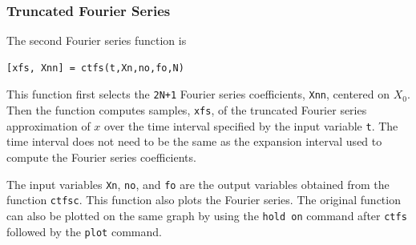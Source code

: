 \subsubsection{Truncated Fourier Series}
The second Fourier series function is
\begin{verbatim}
[xfs, Xnn] = ctfs(t,Xn,no,fo,N)
\end{verbatim}
This function first selects the \verb=2N+1= Fourier series coefficients, \verb=Xnn=, centered on $X_0$.  Then the function computes samples, \verb=xfs=, of the truncated Fourier series approximation of $x$ over the time interval specified by the input variable \verb=t=.  The time interval does not need to be the same as the expansion interval used to compute the Fourier series coefficients.
\par
The input variables \verb=Xn=, \verb=no=, and \verb=fo= are the output variables obtained from the function \verb=ctfsc=.  This function also plots the Fourier series.  The original function can also be plotted on the same graph by using the \verb=hold on= command after \verb=ctfs= followed by the \verb=plot= command.

